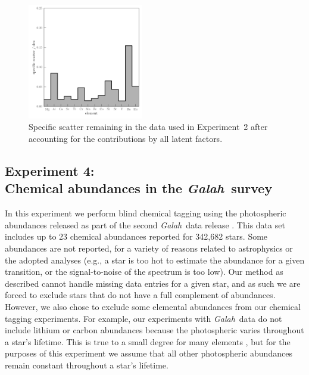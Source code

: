 \documentclass[twocolumn]{aastex62}
\newcommand{\project}[1]{\textsl{#1}}
\newcommand{\Galah}{\project{Galah}}
\begin{document}



\begin{figure}
	\includegraphics[width=0.45\textwidth]{experiments/exp2-specific-scatter.png}
	\caption{Specific scatter remaining in the \citet{Barklem:2005} data used in
			 Experiment~2 after accounting for the contributions by all latent
			 factors.}
    \label{fig:exp2-specific-scatter}
\end{figure}



\subsection{Experiment 4:\\Chemical abundances in the \Galah\ survey}
\label{sec:exp4}

In this experiment we perform blind chemical tagging using the 
photospheric abundances released as part of the second \Galah\ 
data release \citep{Buder:2018}. This data set includes
up to 23 chemical abundances reported for 342,682 stars.
Some abundances are not reported, for a variety of 
reasons related to astrophysics or the adopted analyses
(e.g., a star is too hot to estimate the abundance for a given
transition, or the signal-to-noise of the spectrum is too low).
Our method as described cannot handle missing data entries for
a given star, and as such we are forced to exclude stars that
do not have a full complement of abundances. However, we also
chose to exclude some elemental abundances from our chemical
tagging experiments. For example, our experiments
with \Galah\ data do not include lithium or carbon abundances because the
photospheric varies throughout a star's lifetime. This is true
to a small degree for many elements \citep[e.g.,][]{Dotter:2017},
but for the purposes of this experiment we assume that all other
photospheric abundances remain constant throughout  a star's
lifetime.
\end{document}
